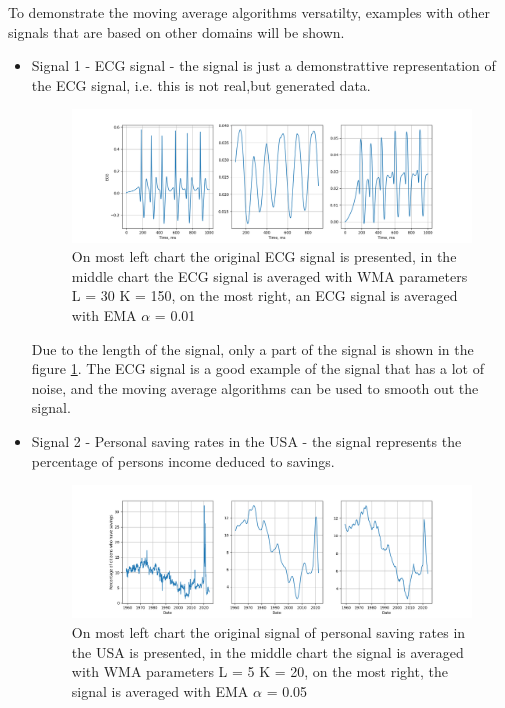 \documentclass[a4paper,12pt,fleqn]{article}
\begin{document}
                \hspace{1em} To demonstrate the moving average algorithms versatilty, examples with other
                signals that are based on other domains will be shown. 
                \begin{itemize}
                    \item Signal 1 - ECG signal\cite{ECG} - the signal is just a demonstrattive representation of the ECG signal, i.e. this is not real,but
                    generated data.
                    \begin{figure}[ht]
                        \centering
                        \includegraphics[width=1\textwidth]{images/ECG.png} %
                        \caption{On most left chart the original ECG signal is presented, in the middle chart the ECG signal is averaged with WMA parameters L = 30 K = 150, on the most right, an ECG signal is averaged with EMA $\alpha$ = 0.01}
                        \label{fig:ECG}
                    \end{figure}
                    Due to the length of the signal, only a part of the signal is shown in the figure \ref{fig:ECG}. The ECG signal is a good example of the signal that has a lot of noise, and the moving average algorithms can be used to smooth out the signal.
                   \newpage
                    \item Signal 2 - Personal saving rates in the USA\cite{PSAVERT} - the signal represents the percentage of persons income deduced to savings.
                    \begin{figure}[ht]
                        \centering
                        \includegraphics[width=1\textwidth]{images/PSAVERT.png} %
                        \caption{On most left chart the original signal of personal saving rates in the USA is presented, in 
                        the middle chart the signal is averaged with WMA parameters L = 5 K = 20, on the most right, the signal is averaged with EMA $\alpha$ = 0.05}
                        \label{fig:PSAVERT}
                    \end{figure}


\end{itemize}
\end{document}

